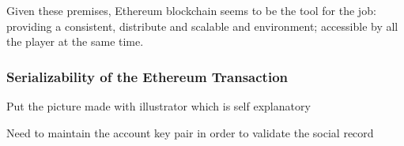 Given these premises, Ethereum blockchain seems to be the tool for the job: providing a consistent, distribute and scalable and environment; accessible by all the player at the same time.



\subsubsection{Serializability of the Ethereum Transaction}

Put the picture made with illustrator which is self explanatory


\begin{notation}
  Need to maintain the account key pair in order to validate the social record
\end{notation}